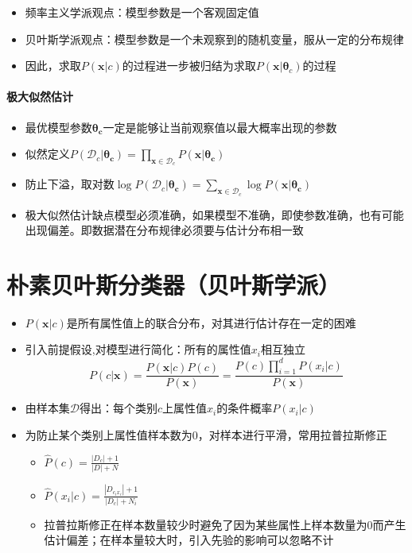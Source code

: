 \begin{itemize}
\item 频率主义学派观点：模型参数是一个客观固定值
\item 贝叶斯学派观点：模型参数是一个未观察到的随机变量，服从一定的分布规律
\item 因此，求取$P(\bm{x}|c)$的过程进一步被归结为求取$P(\bm{x}|\bm{\theta}_c)$的过程
\end{itemize}

\paragraph{极大似然估计}

\begin{itemize}
\item 最优模型参数$\bm{\theta_c}$一定是能够让当前观察值以最大概率出现的参数
\item 似然定义$P(\mathcal{D}_c|\bm{\theta_c})=\prod_{\bm{x}\in\mathcal{D}_c}P(\bm{x}|\bm{\theta_c})$
\item 防止下溢，取对数$\log P(\mathcal{D}_c|\bm{\theta_c})=\sum_{\bm{x}\in\mathcal{D}_c}\log P(\bm{x}|\bm{\theta_c})$
\item 极大似然估计缺点模型必须准确，如果模型不准确，即使参数准确，也有可能出现偏差。即数据潜在分布规律必须要与估计分布相一致
\end{itemize}

\section{朴素贝叶斯分类器（贝叶斯学派）}

\begin{itemize}
\item $P(\bm{x}|c)$是所有属性值上的联合分布，对其进行估计存在一定的困难
\item 引入前提假设,对模型进行简化：所有的属性值$x_i$相互独立$$P(c|\bm{x})=\frac{P(\bm{x}|c)P(c)}{P(\bm{x})}=\frac{P(c)\prod_{i=1}^dP(x_i|c)}{P(\bm{x})}$$
\item 由样本集$\mathcal{D}$得出：每个类别$c$上属性值$x_i$的条件概率$P(x_i|c)$
\item 为防止某个类别上属性值样本数为0，对样本进行平滑，常用拉普拉斯修正
    \begin{itemize}
    \item $\widehat{P}(c)=\frac{|D_c|+1}{|D|+N}$
    \item $\widehat{P}(x_i|c)=\frac{|D_{c_ix_i}|+1}{|D_c|+N_i}$
    \item 拉普拉斯修正在样本数量较少时避免了因为某些属性上样本数量为0而产生估计偏差；在样本量较大时，引入先验的影响可以忽略不计
    \end{itemize}
\end{itemize}


